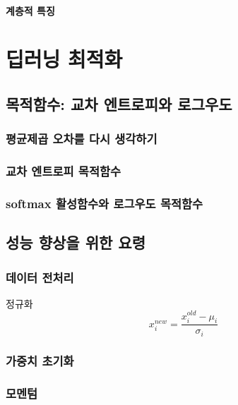 \documentclass [12pt] {oblivoir}
\let\oldsubsubsection=\subsubsection
\renewcommand{\subsubsection}
{
  \filbreak
  \oldsubsubsection
}
\begin{document}
\vspace{3mm}

\paragraph*{계층적 특징}\mbox{}

\vspace{3mm}

\newpage
\section{딥러닝 최적화}

\subsection{목적함수: 교차 엔트로피와 로그우도}

\subsubsection{평균제곱 오차를 다시 생각하기}

\subsubsection{교차 엔트로피 목적함수}

\subsubsection{softmax 활성함수와 로그우도 목적함수}

\subsection{성능 향상을 위한 요령}

\subsubsection{데이터 전처리}

정규화
\begin{equation} \tag{5.9}
  x_{i}^{new} = \frac{x_{i}^{old} - \mu_{i}}{\sigma_{i}}
\end{equation}

\subsubsection{가중치 초기화}

\subsubsection{모멘텀}
\end{document}
